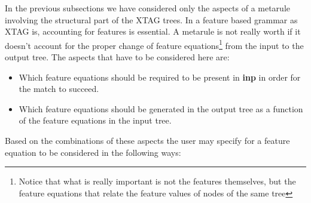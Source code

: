 In the previous subsections we have considered only the aspects of a metarule
involving the structural part of the XTAG trees. In a feature based grammar
as XTAG is, accounting for features is essential. A metarule is not really
worth if it doesn't account for the proper change of feature 
equations\footnote{Notice that what is really important is not the features
themselves, but the feature equations that relate the feature values of nodes
of the same tree} from the input to the output tree. 
The aspects that have to be considered here are:

\begin{itemize}
\item   Which feature equations should be required to be present in {\bf inp}
        in order for the match to succeed.

\item   Which feature equations should be generated in the output tree as a 
        function of the feature equations in the input tree.
\end{itemize}

Based on the combinations of these aspects the user may specify for a feature
equation to be considered in the following ways:

